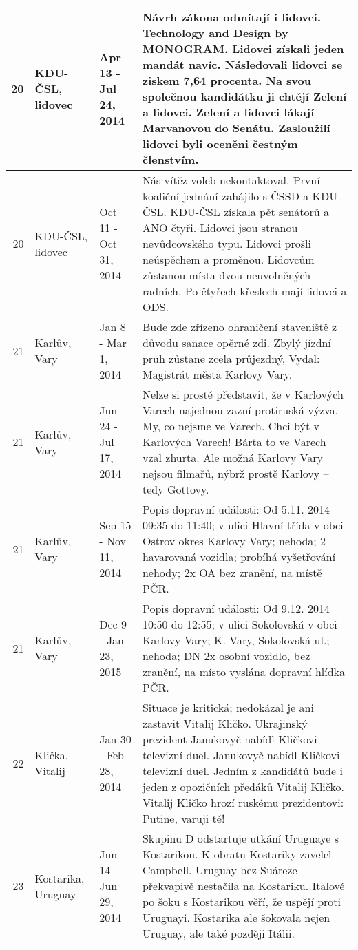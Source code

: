 \begin{tabularx}{\linewidth}{r m{2.5cm} X m{8cm}}
20 & KDU-ČSL, lidovec & Apr 13 - Jul 24, 2014 & Návrh zákona odmítají i lidovci. Technology and Design by MONOGRAM. Lidovci získali jeden mandát navíc. Následovali lidovci se ziskem 7,64 procenta. Na svou společnou kandidátku ji chtějí Zelení a lidovci. Zelení a lidovci lákají Marvanovou do Senátu. Zasloužilí lidovci byli oceněni čestným členstvím. \\ \midrule
20 & KDU-ČSL, lidovec & Oct 11 - Oct 31, 2014 & Nás vítěz voleb nekontaktoval. První koaliční jednání zahájilo s ČSSD a KDU-ČSL. KDU-ČSL získala pět senátorů a ANO čtyři. Lidovci jsou stranou nevůdcovského typu. Lidovci prošli neúspěchem a proměnou. Lidovcům zůstanou místa dvou neuvolněných radních. Po čtyřech křeslech mají lidovci a ODS. \\ \midrule
21 & Karlův, Vary & Jan 8 - Mar 1, 2014 & Bude zde zřízeno ohraničení staveniště z důvodu sanace opěrné zdi. Zbylý jízdní pruh zůstane zcela průjezdný, Vydal: Magistrát města Karlovy Vary. \\ \midrule
21 & Karlův, Vary & Jun 24 - Jul 17, 2014 & Nelze si prostě představit, že v Karlových Varech najednou zazní protiruská výzva. My, co nejsme ve Varech. Chci být v Karlových Varech! Bárta to ve Varech vzal zhurta. Ale možná Karlovy Vary nejsou filmařů, nýbrž prostě Karlovy – tedy Gottovy. \\ \midrule
21 & Karlův, Vary & Sep 15 - Nov 11, 2014 & Popis dopravní události: Od 5.11. 2014 09:35 do 11:40; v ulici Hlavní třída v obci Ostrov okres Karlovy Vary; nehoda; 2 havarovaná vozidla; probíhá vyšetřování nehody; 2x OA bez zranění, na místě PČR. \\ \midrule
21 & Karlův, Vary & Dec 9 - Jan 23, 2015 & Popis dopravní události: Od 9.12. 2014 10:50 do 12:55; v ulici Sokolovská v obci Karlovy Vary; K. Vary, Sokolovská ul.; nehoda; DN 2x osobní vozidlo, bez zranění, na místo vyslána dopravní hlídka PČR. \\ \midrule
22 & Klička, Vitalij & Jan 30 - Feb 28, 2014 & Situace je kritická; nedokázal je ani zastavit Vitalij Kličko. Ukrajinský prezident Janukovyč nabídl Kličkovi televizní duel. Janukovyč nabídl Kličkovi televizní duel. Jedním z kandidátů bude i jeden z opozičních předáků Vitalij Kličko. Vitalij Kličko hrozí ruskému prezidentovi: Putine, varuji tě! \\ \midrule
23 & Kostarika, Uruguay & Jun 14 - Jun 29, 2014 & Skupinu D odstartuje utkání Uruguaye s Kostarikou. K obratu Kostariky zavelel Campbell. Uruguay bez Suáreze překvapivě nestačila na Kostariku. Italové po šoku s Kostarikou věří, že uspějí proti Uruguayi. Kostarika ale šokovala nejen Uruguay, ale také později Itálii. \\ \midrule

\end{tabularx}
